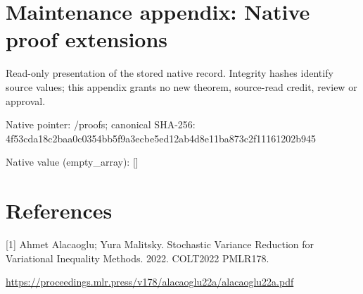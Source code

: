 \documentclass[10pt,a4paper]{article}
\begin{document}
\section{Maintenance appendix: Native proof extensions}


Read-only presentation of the stored native record. Integrity hashes identify source values; this appendix grants no new theorem, source-read credit, review or approval.



Native pointer: /proofs; canonical SHA-256: 4f53cda18c2baa0c0354bb5f\allowbreak{}9a3ecbe5ed12ab4d8e11ba87\allowbreak{}3c2f11161202b945



Native value (empty\_array): []



\section{References}


[1] Ahmet Alacaoglu; Yura Malitsky. Stochastic Variance Reduction for Variational Inequality Methods. 2022. COLT2022 PMLR178.



\url{https://proceedings.mlr.press/v178/alacaoglu22a/alacaoglu22a.pdf}
\end{document}
